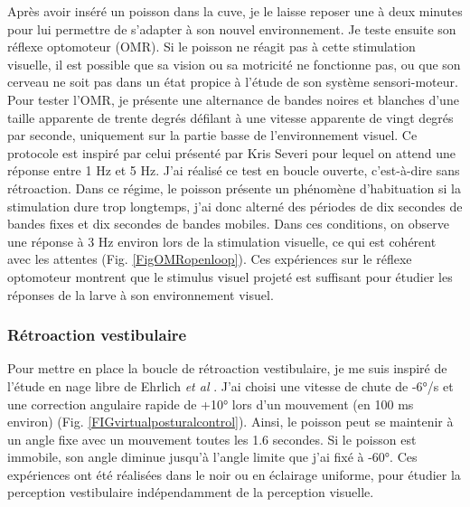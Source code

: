 Après avoir inséré un poisson dans la cuve, je le laisse reposer une à deux minutes pour lui permettre de s'adapter à son nouvel environnement. Je teste ensuite son réflexe optomoteur (OMR). Si le poisson ne réagit pas à cette stimulation visuelle, il est possible que sa vision ou sa motricité ne fonctionne pas, ou que son cerveau ne soit pas dans un état propice à l'étude de son système sensori-moteur. Pour tester l'OMR, je présente une alternance de bandes noires et blanches d'une taille apparente de trente degrés défilant à une vitesse apparente de vingt degrés par seconde, uniquement sur la partie basse de l'environnement visuel. Ce protocole est inspiré par celui présenté par Kris Severi \cite{severi_neural_2014} pour lequel on attend une réponse entre 1 Hz et 5 Hz. J'ai réalisé ce test en boucle ouverte, c'est-à-dire sans rétroaction. Dans ce régime, le poisson présente un phénomène d'habituation si la stimulation dure trop longtemps, j'ai donc alterné des périodes de dix secondes de bandes fixes et dix secondes de bandes mobiles. Dans ces conditions, on observe une réponse à 3 Hz environ lors de la stimulation visuelle, ce qui est cohérent avec les attentes (Fig. \ref{FigOMRopenloop}). Ces expériences sur le réflexe optomoteur montrent que le stimulus visuel projeté est suffisant pour étudier les réponses de la larve à son environnement visuel.


\subsubsection{Rétroaction vestibulaire}\label{subsubretrovestib}

Pour mettre en place la boucle de rétroaction vestibulaire, je me suis inspiré de l'étude en nage libre de Ehrlich \emph{et al} \cite{ehrlich_control_2017}. J'ai choisi une vitesse de chute de -6°/s et une correction angulaire rapide de +10° lors d'un mouvement (en 100 ms environ) (Fig. \ref{FIGvirtualposturalcontrol}). Ainsi, le poisson peut se maintenir à un angle fixe avec un mouvement toutes les 1.6 secondes. Si le poisson est immobile, son angle diminue jusqu'à l'angle limite que j'ai fixé à -60°. Ces expériences ont été réalisées dans le noir ou en éclairage uniforme, pour étudier la perception vestibulaire indépendamment de la perception visuelle.

